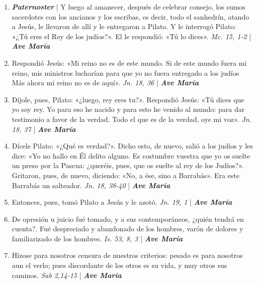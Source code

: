 \documentclass[../../devocionario.tex]{subfiles}
\begin{document}
    \begin{enumerate}
    
        \item \textbf{\textit{Paternoster}} | Y luego al amanecer, después de celebrar consejo, los sumos sacerdotes con los ancianos y los escribas, 
            es decir, todo el sanhedrín, atando a Jesús, le llevaron de allí y le entregaron a Pilato. 
            Y le interrogó Pilato: «¿Tú eres el Rey de los judíos?». El le respondió: «Tú lo dices». \textit{Mc. 15, 1-2} | \textbf{\textit{Ave María}}

        \item Respondió Jesús: «Mi reino no es de este mundo. Si de este mundo fuera mi reino, mis ministros lucharían para 
            que yo no fuera entregado a los judíos Más ahora mi reino no es de aquí». \textit{Jn. 18, 36} | \textbf{\textit{Ave María}}

        \item Díjole, pues, Pilato: «¿luego, rey eres tu?». Respondió Jesús: «Tú dices que yo soy rey. Yo para eso he nacido y 
            para esto he venido al mundo: para dar testimonio a favor de la verdad. 
            Todo el que es de la verdad, oye mi voz». \textit{Jn. 18, 37} | \textbf{\textit{Ave María}}

        \item Dícele Pilato: «¿Qué es verdad?». Dicho esto, de nuevo, salió a los judíos y les dice: 
            «Yo no hallo en Él delito alguno. Es costumbre vuestra que yo os suelte un preso por la Pascua: ¿queréis, pues, 
            que os suelte al rey de los Judíos?». Gritaron, pues, de nuevo, diciendo: «No, a ése, sino a Barrabás». 
            Era este Barrabás un salteador. \textit{Jn. 18, 38-40} | \textbf{\textit{Ave María}}

        \item Entonces, pues, tomó Pilato a Jesús y le azotó. \textit{Jn. 19, 1} | \textbf{\textit{Ave María}}

        \item De opresión u juicio fué tomado, y a sus contemporáneos, ¿quién tendrá en cuenta?. Fué despreciado y abandonado de los hombres, 
            varón de dolores y familiarizado de los hombres. \textit{Is. 53, 8, 3} | \textbf{\textit{Ave María}}

        \item Hízose para nosotros censura de nuestros criterios: pesado es para nosotros aun el verlo; 
            pues discordante de los otros es su vida, y muy otros sus caminos. \textit{Sab 2,14-15} | \textbf{\textit{Ave María}}


\end{enumerate}
\end{document}
